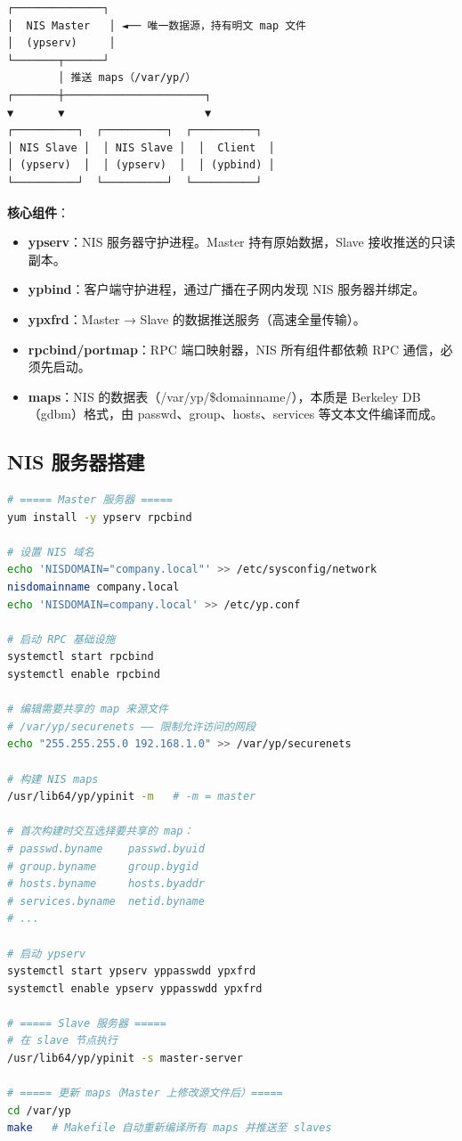 \documentclass[12pt,UTF8]{ctexbook}
\begin{document}
\begin{lstlisting}
┌──────────────┐
│  NIS Master   │ ◄── 唯一数据源，持有明文 map 文件
│  (ypserv)     │
└───────┬──────┘
        │ 推送 maps（/var/yp/）
┌───────┼──────────────────────┐
▼       ▼                      ▼
┌──────────┐  ┌──────────┐  ┌──────────┐
│ NIS Slave │  │ NIS Slave │  │  Client  │
│ (ypserv)  │  │ (ypserv)  │  │ (ypbind) │
└──────────┘  └──────────┘  └──────────┘
\end{lstlisting}

\textbf{核心组件}：

\begin{itemize}
    \item \textbf{ypserv}：NIS 服务器守护进程。Master 持有原始数据，Slave 接收推送的只读副本。
    \item \textbf{ypbind}：客户端守护进程，通过广播在子网内发现 NIS 服务器并绑定。
    \item \textbf{ypxfrd}：Master → Slave 的数据推送服务（高速全量传输）。
    \item \textbf{rpcbind/portmap}：RPC 端口映射器，NIS 所有组件都依赖 RPC 通信，必须先启动。
    \item \textbf{maps}：NIS 的数据表（/var/yp/\$domainname/），本质是 Berkeley DB（gdbm）格式，由 passwd、group、hosts、services 等文本文件编译而成。
\end{itemize}

\subsection{NIS 服务器搭建}

\begin{lstlisting}[language=bash]
# ===== Master 服务器 =====
yum install -y ypserv rpcbind

# 设置 NIS 域名
echo 'NISDOMAIN="company.local"' >> /etc/sysconfig/network
nisdomainname company.local
echo 'NISDOMAIN=company.local' >> /etc/yp.conf

# 启动 RPC 基础设施
systemctl start rpcbind
systemctl enable rpcbind

# 编辑需要共享的 map 来源文件
# /var/yp/securenets —— 限制允许访问的网段
echo "255.255.255.0 192.168.1.0" >> /var/yp/securenets

# 构建 NIS maps
/usr/lib64/yp/ypinit -m   # -m = master

# 首次构建时交互选择要共享的 map：
# passwd.byname    passwd.byuid
# group.byname     group.bygid
# hosts.byname     hosts.byaddr
# services.byname  netid.byname
# ...

# 启动 ypserv
systemctl start ypserv yppasswdd ypxfrd
systemctl enable ypserv yppasswdd ypxfrd

# ===== Slave 服务器 =====
# 在 slave 节点执行
/usr/lib64/yp/ypinit -s master-server

# ===== 更新 maps（Master 上修改源文件后）=====
cd /var/yp
make   # Makefile 自动重新编译所有 maps 并推送至 slaves
\end{lstlisting}
\end{document}
